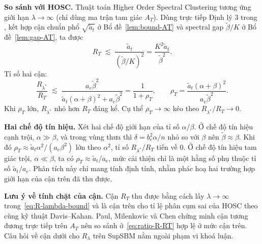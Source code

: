 \textbf{So sánh với HOSC.} Thuật toán Higher Order Spectral Clustering tương ứng giới hạn $\lambda \to \infty$ (chỉ dùng ma trận tam giác $A_T$). Dùng trực tiếp Định lý 3 trong \cite{paul2023hosc}, kết hợp cận chuẩn phổ $\sqrt{\tilde a_t}$ ở Bổ đề~\ref{lem:bound-AT} và spectral gap $\tilde\beta/K$ ở Bổ đề~\ref{lem:gap-AT}, ta được
\begin{equation}
    \label{eq:R-T-bound}
    R_T \;\lesssim\; \frac{\tilde a_t}{(\tilde\beta/K)^2} = \frac{K^2 \tilde a_t}{\tilde\beta^2}.
\end{equation}
Tỉ số hai cận:
\begin{equation}
    \label{eq:ratio-R-RT}
    \frac{R_{\lambda^*}}{R_T} \;\lesssim\; \frac{a_e \tilde\beta^2}{\tilde a_t (\alpha + \beta)^2 + a_e \tilde\beta^2} = \frac{1}{1 + \rho_T}, \qquad \rho_T = \frac{\tilde a_t (\alpha + \beta)^2}{a_e \tilde\beta^2}.
\end{equation}
Khi $\rho_T$ lớn, $R_{\lambda^*}$ nhỏ hơn $R_T$ đáng kể. Cụ thể $\rho_T \to \infty$ kéo theo $R_{\lambda^*}/R_T \to 0$.

\textbf{Hai chế độ tín hiệu.} Xét hai chế độ giới hạn của tỉ số $\alpha/\beta$. Ở chế độ tín hiệu cạnh trội, $\alpha \gg \beta$, và trong vùng thưa thì $\delta = b_e^2 \alpha / n$ nhỏ so với $\beta$ nên $\tilde\beta \approx \beta$. Khi đó $\rho_T \approx \tilde a_t \alpha^2 / (a_e \beta^2)$ lớn theo $\alpha^2$, tỉ số $R_{\lambda^*}/R_T$ tiến về $0$. Ở chế độ tín hiệu tam giác trội, $\alpha \ll \beta$, ta có $\rho_T \approx \tilde a_t / a_e$, mức cải thiện chỉ là một hằng số phụ thuộc tỉ số $\tilde a_t / a_e$. Phân tích này chỉ mang tính định tính, nhằm phác hoạ hai trường hợp giới hạn của cận trên đã thu được.

\textbf{Lưu ý về tính chặt của cận.} Cận $R_T$ thu được bằng cách lấy $\lambda \to \infty$ trong~\eqref{eq:R-lambda-bound} và là cận trên cho tỉ lệ phân cụm sai của HOSC theo cùng kỹ thuật Davis--Kahan. Paul, Milenkovic và Chen \cite{paul2023hosc} chứng minh cận tương đương trực tiếp trên $A_T$ nên so sánh ở~\eqref{eq:ratio-R-RT} hợp lệ ở mức cận trên. Câu hỏi về cận dưới cho $R_\lambda$ trên SupSBM nằm ngoài phạm vi khoá luận.
